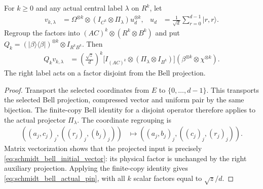 \begin{theorem}
\label{thm:schmidt_bell_prevector_pin}
\leanok
{}
For $k\ge0$ and any actual central label $\lambda$ on $R^k$, let
\begin{align}
 v_{k,\lambda}&=\Omega^{\otimes k}\otimes
                  (I_{C^k}\otimes\Pi_\lambda)u_d^{\otimes k},
 &u_d&=\frac1{\sqrt d}\sum_{r=0}^{d-1}|r,r\rangle.
 \label{eq:schmidt_bell_initial_vector}
\end{align}
Regroup the factors into $(AC)^k\otimes(R^k\otimes B^k)$ and put
$Q_k=(|\beta\rangle\langle\beta|)^{\otimes k}\otimes I_{R^kB^k}$.
Then
\begin{align}
 Q_k v_{k,\lambda}
   &=\left(\frac{\sqrt z}{d}\right)^k
       \bigl[I_{(AC)^k}\otimes(\Pi_\lambda\otimes I_{B^k})\bigr]
       (\beta^{\otimes k}\otimes\chi^{\otimes k}).
 \label{eq:schmidt_bell_actual_pin}
\end{align}
The right label acts on a factor disjoint from the Bell projection.
\end{theorem}
\begin{proof}
\leanok
{}
Transport the selected coordinates from $E$ to $\{0,\ldots,d-1\}$.
This transports the selected Bell projection, compressed vector and uniform
pair by the same bijection. The finite-copy Bell identity for a disjoint
operator therefore applies to the actual projector $\Pi_\lambda$.
The coordinate regrouping is
\begin{align}
 ((a_j,c_j)_j,((r_j)_j,(b_j)_j))
   &\longmapsto ((a_j,b_j)_j,((c_j)_j,(r_j)_j)).
 \label{eq:schmidt_bell_regroup}
\end{align}
Matrix vectorization shows that the projected input is precisely
\eqref{eq:schmidt_bell_initial_vector}: its physical factor is unchanged by
the right auxiliary projection. Applying the finite-copy identity gives
\eqref{eq:schmidt_bell_actual_pin}, with all $k$ scalar factors equal to
$\sqrt z/d$.
\end{proof}

